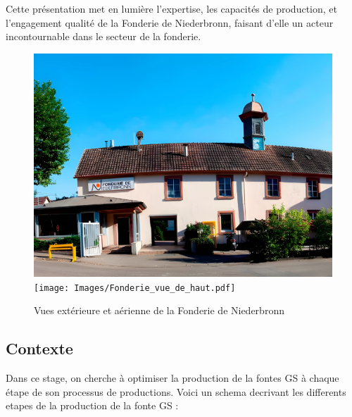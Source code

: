 \documentclass[12pt]{article}
\begin{document}
\sloppy
Cette présentation met en lumière l'expertise, les capacités de production,
et l'engagement qualité de la Fonderie de Niederbronn, faisant d'elle un acteur 
incontournable dans le secteur de la fonderie.


\begin{figure}[H]
    \centering
    \vfill
    \includegraphics[scale=0.27]{Images/Fonderie_vue_de_bas.pdf}
    \hspace{0.5 cm}
    \texttt{[image: Images/Fonderie\_vue\_de\_haut.pdf]}
    \caption{Vues extérieure et aérienne de la Fonderie de Niederbronn}
\end{figure}


\subsection{Contexte}

Dans ce stage, on cherche à optimiser la production de la fontes GS à chaque étape 
de son processus de productions. Voici un schema decrivant les differents etapes de 
la production de la fonte GS :
\end{document}
